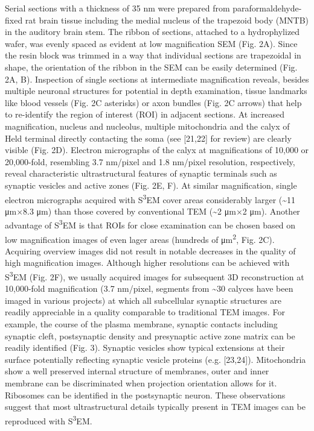 \documentclass{article}
\begin{document}
Serial sections with a thickness of 35 nm were prepared from paraformaldehyde-fixed rat brain tissue including the medial nucleus of the trapezoid body (MNTB) in the auditory brain stem. The ribbon of sections, attached to a hydrophylized wafer, was evenly spaced as evident at low magnification SEM (Fig. 2A). Since the resin block was trimmed in a way that individual sections are trapezoidal in shape, the orientation of the ribbon in the SEM can be easily determined (Fig. 2A, B). Inspection of single sections at intermediate magnification reveals, besides multiple neuronal structures for potential in depth examination, tissue landmarks like blood vessels (Fig. 2C asterisks) or axon bundles (Fig. 2C arrows) that help to re-identify the region of interest (ROI) in adjacent sections. At increased magnification, nucleus and nucleolus, multiple mitochondria and the calyx of Held terminal directly contacting the soma (see [21,22] for review) are clearly visible (Fig. 2D). Electron micrographs of the calyx at magnifications of 10,000 or 20,000-fold, resembling 3.7 nm/pixel and 1.8 nm/pixel resolution, respectively, reveal characteristic ultrastructural features of synaptic terminals such as synaptic vesicles and active zones (Fig. 2E, F). At similar magnification, single electron micrographs acquired with S\textsuperscript{3}EM cover areas considerably larger (\textasciitilde{}11 μm×8.3 μm) than those covered by conventional TEM (\textasciitilde{}2 μm×2 μm). Another advantage of S\textsuperscript{3}EM is that ROIs for close examination can be chosen based on low magnification images of even lager areas (hundreds of μm\textsuperscript{2}, Fig. 2C). Acquiring overview images did not result in notable decreases in the quality of high magnification images. Although higher resolutions can be achieved with S\textsuperscript{3}EM (Fig. 2F), we usually acquired images for subsequent 3D reconstruction at 10,000-fold magnification (3.7 nm/pixel, segments from \textasciitilde{}30 calyces have been imaged in various projects) at which all subcellular synaptic structures are readily appreciable in a quality comparable to traditional TEM images. For example, the course of the plasma membrane, synaptic contacts including synaptic cleft, postsynaptic density and presynaptic active zone matrix can be readily identified (Fig. 3). Synaptic vesicles show typical extensions at their surface potentially reflecting synaptic vesicle proteins (e.g. [23,24]). Mitochondria show a well preserved internal structure of membranes, outer and inner membrane can be discriminated when projection orientation allows for it. Ribosomes can be identified in the postsynaptic neuron. These observations suggest that most ultrastructural details typically present in TEM images can be reproduced with S\textsuperscript{3}EM.
\end{document}
